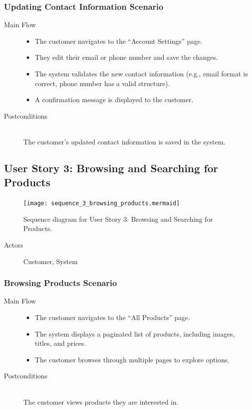 \documentclass[twoside,a4paper,journal]{IEEEtran}
\begin{document}
\subsubsection{Updating Contact Information Scenario}
\begin{description}
  \item[Main Flow] \hfill
    \begin{itemize}
      \item The customer navigates to the ``Account Settings'' page.
      \item They edit their email or phone number and save the changes.
      \item The system validates the new contact information (e.g., email format
        is correct, phone number has a valid structure).
      \item A confirmation message is displayed to the customer.
    \end{itemize}
  \item[Postconditions] \hfill \\
    The customer's updated contact information is saved in the system.
\end{description}
\subsection{User Story 3: Browsing and Searching for Products}
\begin{figure}[!t]
\centering
\texttt{[image: sequence\_3\_browsing\_products.mermaid]}
\caption{Sequence diagram for User Story 3: Browsing and Searching for Products.}
\label{fig:sequence_3}
\end{figure}
\begin{description}
  \item[Actors] Customer, System
\end{description}
\subsubsection{Browsing Products Scenario}
\begin{description}
  \item[Main Flow] \hfill
    \begin{itemize}
      \item The customer navigates to the ``All Products'' page.
      \item The system displays a paginated list of products,
        including images, titles, and prices.
      \item The customer browses through multiple pages to explore options.
    \end{itemize}
  \item[Postconditions] \hfill \\
    The customer views products they are interested in.
\end{description}
\end{document}

